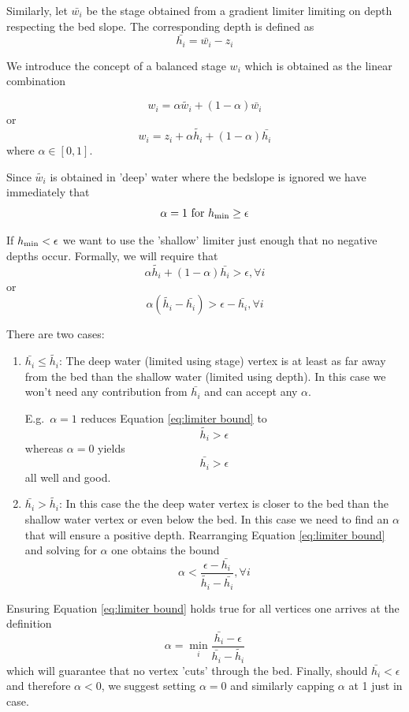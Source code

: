 \documentclass{manual}
\begin{document}
Similarly, let $\bar{w_i}$ be the stage obtained from a gradient
limiter limiting on depth respecting the bed slope.
The corresponding depth is defined as
\[
  \bar{h_i} = \bar{w_i} - z_i
\]

We introduce the concept of a balanced stage $w_i$ which is obtained as
the linear combination

\[
  w_i = \alpha \tilde{w_i} + (1-\alpha) \bar{w_i}
\]
or
\[
  w_i = z_i + \alpha \tilde{h_i} + (1-\alpha) \bar{h_i}
\]
where $\alpha \in [0, 1]$.

Since $\tilde{w_i}$ is obtained in 'deep' water where the bedslope
is ignored we have immediately that
\[
  \alpha = 1 \mbox{ for } \hmin \ge \epsilon %
\]

If $h_{\min} < \epsilon$ we want to use the 'shallow' limiter just enough that
no negative depths occur. Formally, we will require that
\[
  \alpha \tilde{h_i} + (1-\alpha) \bar{h_i} > \epsilon, \forall i
\]
or
\begin{equation}
  \alpha(\tilde{h_i} - \bar{h_i}) > \epsilon - \bar{h_i}, \forall i
  \label{eq:limiter bound}
\end{equation}

There are two cases:
\begin{enumerate}
  \item $\bar{h_i} \le \tilde{h_i}$: The deep water (limited using stage)
  vertex is at least as far away from the bed than the shallow water
  (limited using depth). In this case we won't need any contribution from
  $\bar{h_i}$ and can accept any $\alpha$.

  E.g.\ $\alpha=1$ reduces Equation \ref{eq:limiter bound} to
  \[
    \tilde{h_i} > \epsilon
  \]
  whereas $\alpha=0$ yields
  \[
    \bar{h_i} > \epsilon
  \]
  all well and good.
  \item $\bar{h_i} > \tilde{h_i}$: In this case the the deep water vertex is
  closer to the bed than the shallow water vertex or even below the bed.
  In this case we need to find an $\alpha$ that will ensure a positive depth.
  Rearranging Equation \ref{eq:limiter bound} and solving for $\alpha$ one
  obtains the bound
  \[
    \alpha < \frac{\epsilon - \bar{h_i}}{\tilde{h_i} - \bar{h_i}}, \forall i
  \]
\end{enumerate}

Ensuring Equation \ref{eq:limiter bound} holds true for all vertices one
arrives at the definition
\[
  \alpha = \min_{i} \frac{\bar{h_i} - \epsilon}{\bar{h_i} - \tilde{h_i}}
\]
which will guarantee that no vertex 'cuts' through the bed. Finally, should
$\bar{h_i} < \epsilon$ and therefore $\alpha < 0$, we suggest setting
$\alpha=0$ and similarly capping $\alpha$ at 1 just in case.
\end{document}
